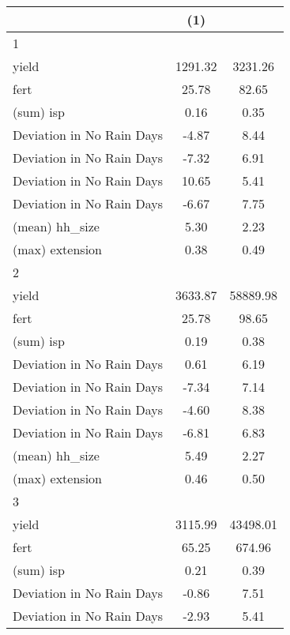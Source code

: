 {
\def\sym#1{\ifmmode^{#1}\else\(^{#1}\)\fi}
\begin{tabular}{l*{1}{cc}}
\hline\hline
                    &\multicolumn{1}{c}{(1)}&            \\
\hline
1                   &            &            \\
yield               &     1291.32&     3231.26\\
fert                &       25.78&       82.65\\
(sum) isp           &        0.16&        0.35\\
Deviation in No Rain Days&       -4.87&        8.44\\
Deviation in No Rain Days&       -7.32&        6.91\\
Deviation in No Rain Days&       10.65&        5.41\\
Deviation in No Rain Days&       -6.67&        7.75\\
(mean) hh\_size      &        5.30&        2.23\\
(max) extension     &        0.38&        0.49\\
\hline
2                   &            &            \\
yield               &     3633.87&    58889.98\\
fert                &       25.78&       98.65\\
(sum) isp           &        0.19&        0.38\\
Deviation in No Rain Days&        0.61&        6.19\\
Deviation in No Rain Days&       -7.34&        7.14\\
Deviation in No Rain Days&       -4.60&        8.38\\
Deviation in No Rain Days&       -6.81&        6.83\\
(mean) hh\_size      &        5.49&        2.27\\
(max) extension     &        0.46&        0.50\\
\hline
3                   &            &            \\
yield               &     3115.99&    43498.01\\
fert                &       65.25&      674.96\\
(sum) isp           &        0.21&        0.39\\
Deviation in No Rain Days&       -0.86&        7.51\\
Deviation in No Rain Days&       -2.93&        5.41\\

\end{tabular}}

